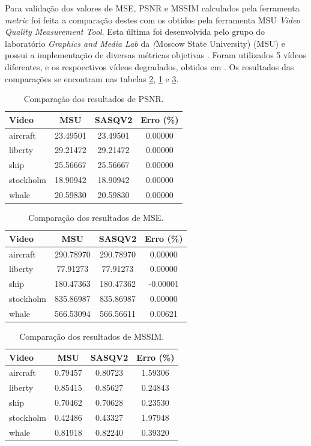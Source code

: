 Para validação dos valores de MSE, PSNR e MSSIM calculados pela ferramenta \emph{metric} foi feita a comparação destes com os obtidos pela ferramenta MSU \emph{Video Quality Measurement Tool}.
Esta última foi desenvolvida pelo grupo do laboratório \emph{Graphics and Media Lab} da \emph(Moscow State University) (MSU) e possui a implementação de diversas métricas objetivas \cite{moscowuniversity}.
Foram utilizados 5 vídeos diferentes, e os respoectivos vídeos degradados,  obtidos em \cite{}. Os resultados das comparações se encontram nas tabelas \ref{res:mse}, \ref{res:psnr} e \ref{res:mssim}.

\begin{table}
	\centering
	\caption{Comparação dos resultados de PSNR.}
	\label{res:psnr}
	\begin{tabular}{lccc}
		\hline
		Video	 & MSU	 & SASQV2	 & Erro (\%) \\ \hline
		aircraft	 & 23.49501 & 23.49501 & 0.00000	 \\ 
		liberty	 & 29.21472 & 29.21472 & 0.00000	 \\ 
		ship	 & 25.56667 & 25.56667 & 0.00000	 \\ 
		stockholm & 18.90942 & 18.90942 & 0.00000	 \\ 
		whale	 & 20.59830 & 20.59830 & 0.00000	 \\
	\hline
	\end{tabular}
\end{table}

\begin{table}
	\centering
	\caption{Comparação dos resultados de MSE.}
	\label{res:mse}
	\begin{tabular}{lccc}
	\hline
	Video	 & MSU	 & SASQV2	 & Erro (\%) \\ \hline
	aircraft	 & 290.78970 & 290.78970 & 0.00000	 \\ 
	liberty	 & 77.91273	 & 77.91273	 & 0.00000	 \\ 
	ship	 & 180.47363 & 180.47362 & -0.00001 \\ 
	stockholm & 835.86987 & 835.86987 & 0.00000	 \\ 
	whale	 & 566.53094 & 566.56611 & 0.00621	 \\
	\hline
	\end{tabular}
\end{table}

\begin{table}
	\centering
	\caption{Comparação dos resultados de MSSIM.}
	\label{res:mssim}
	\begin{tabular}{lccc}
	\hline
	Video	 & MSU	 & SASQV2	 & Erro (\%) \\ \hline
	aircraft	 & 0.79457 & 0.80723 & 1.59306	 \\
	liberty	 & 0.85415 & 0.85627 & 0.24843	 \\
	ship	 & 0.70462 & 0.70628 & 0.23530	 \\ 
	stockholm & 0.42486 & 0.43327 & 1.97948	 \\ 
	whale	 & 0.81918 & 0.82240 & 0.39320	 \\
	\hline
	\end{tabular}
\end{table}

